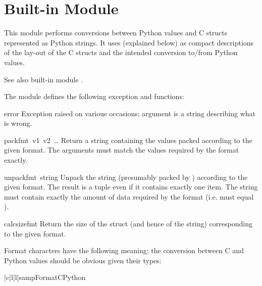 \section{Built-in Module }
\label{module-struct}

This module performs conversions between Python values and C
structs represented as Python strings.  It uses 
(explained below) as compact descriptions of the lay-out of the C
structs and the intended conversion to/from Python values.

See also built-in module .

The module defines the following exception and functions:

\renewcommand{\indexsubitem}{(in module struct)}
\begin{excdesc}{error}
  Exception raised on various occasions; argument is a string
  describing what is wrong.
\end{excdesc}

\begin{funcdesc}{pack}{fmt\, v1\, v2\, {\rm \ldots}}
  Return a string containing the values
   packed according to the given
  format.  The arguments must match the values required by the format
  exactly.
\end{funcdesc}

\begin{funcdesc}{unpack}{fmt\, string}
  Unpack the string (presumably packed by )
  according to the given format.  The result is a tuple even if it
  contains exactly one item.  The string must contain exactly the
  amount of data required by the format (i.e.   must
  equal ).
\end{funcdesc}

\begin{funcdesc}{calcsize}{fmt}
  Return the size of the struct (and hence of the string)
  corresponding to the given format.
\end{funcdesc}

Format characters have the following meaning; the conversion between C
and Python values should be obvious given their types:

\begin{tableiii}{|c|l|l|}{samp}{Format}{C}{Python}
\end{tableiii}

